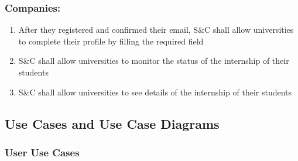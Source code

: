         \subsubsection*{Companies:}
        \begin{enumerate}[label=\textbf{R\arabic*},resume]
            \item After they registered and confirmed their email, S\&C shall allow universities to complete their profile by filling the required field
            \item S\&C shall allow universities to monitor the status of the internship of their students
            \item S\&C shall allow universities to see details of the internship of their students
        \end{enumerate}
        
\newpage

\subsection{Use Cases and Use Case Diagrams}

    \subsubsection{User Use Cases}
    
